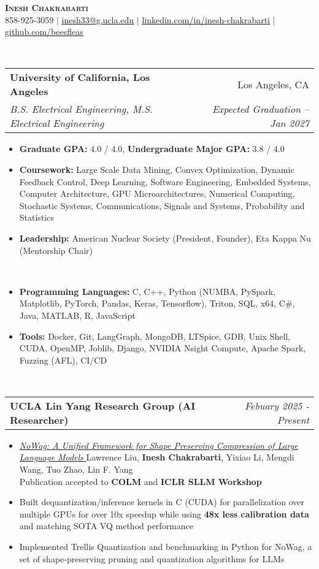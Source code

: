 \documentclass[letterpaper,11pt]{article}
\makeatletter
\newcommand{\resitem}[1]{\item #1 \vspace{-8pt}}
\newcommand{\resheading}[1]{\vspace{8pt}{\Large \textbf{#1}}\\\vspace{-8pt}\hrulefill}
\newcommand{\ressubheading}[4]{\vspace{3pt}
\begin{tabular*}{7.0in}{l@{\cftdotfill{\cftsecdotsep}\extracolsep{\fill}}r}
		\textbf{#1} & #2 \\
		\textit{#3} & \textit{#4} \\
\end{tabular*}\vspace{-6pt}}
\newcommand{\ressubheadingsmol}[2]{\vspace{1pt}
\begin{tabular*}{7.0in}{l@{\cftdotfill{\cftsecdotsep}\extracolsep{\fill}}r}
		\textbf{#1} & \textit{#2} \\
\end{tabular*}\vspace{-6pt}}
\makeatother
\begin{document}
    
\begin{center}
    \textbf{\LARGE \scshape Inesh Chakrabarti} \\ \vspace{1pt}
    \small 858-925-3059 $|$ \href{mailto:inesh33@g.ucla.edu}{\underline{inesh33@g.ucla.edu}} $|$ 
    \href{https://www.linkedin.com/in/inesh-chakrabarti-878602183}{\underline{linkedin.com/in/inesh-chakrabarti}} $|$
    \href{https://github.com/beesfleas}{\underline{github.com/beesfleas}}
\end{center}

\resheading{Education}
\ressubheading{University of California, Los Angeles}{Los Angeles, CA}{B.S. Electrical Engineering, M.S. Electrical Engineering}{Expected Graduation -- Jan 2027}
\begin{itemize}
	\resitem{\textbf{Graduate GPA:} 4.0 / 4.0, \textbf{Undergraduate Major GPA:} 3.8 / 4.0}
	\resitem{\textbf{Coursework:} Large Scale Data Mining, Convex Optimization, Dynamic Feedback Control, Deep Learning, Software Engineering, Embedded Systems, Computer Architecture, GPU Microarchitectures, Numerical Computing, Stochastic Systems,  Communications, Signals and Systems, Probability and Statistics}
    \resitem{\textbf{Leadership:} American Nuclear Society (President, Founder), Eta Kappa Nu (Mentorship Chair)}
\end{itemize}

\resheading{Skills}
\begin{itemize}
\resitem{\textbf{Programming Languages:} C, C++, Python (NUMBA, PySpark, Matplotlib, PyTorch, Pandas, Keras, Tensorflow), Triton, SQL, x64, C\#, Java, MATLAB, R, JavaScript}
\resitem{\textbf{Tools:} Docker, Git, LangGraph, MongoDB, LTSpice, GDB, Unix Shell, CUDA, OpenMP, Joblib, Django, NVIDIA Nsight Compute, Apache Spark, Fuzzing (AFL), CI/CD}
\end{itemize}

\resheading{Experience}
\ressubheadingsmol{UCLA Lin Yang Research Group (AI Researcher)}{Febuary 2025 - Present}{}
\begin{itemize}
  \resitem{\href{https://arxiv.org/abs/2504.14569}{\textit{NoWag: A Unified Framework for Shape Preserving Compression of Large Language Models} 
    } Lawrence Liu, \textbf{Inesh Chakrabarti}, Yixiao Li, Mengdi Wang, Tuo Zhao, Lin F. Yang \\ Publication accepted to \textbf{COLM} and \textbf{ICLR SLLM Workshop}}
    \resitem{Built dequantization/inference kernels in C (CUDA) for parallelization over multiple GPUs for over 10x speedup while using \textbf{48x less calibration data }and matching SOTA VQ method performance}
   \resitem{Implemented Trellis Quantization and benchmarking in Python for NoWag, a set of shape-preserving pruning and quantization algorithms for LLMs}
\end{itemize}
\end{document}

